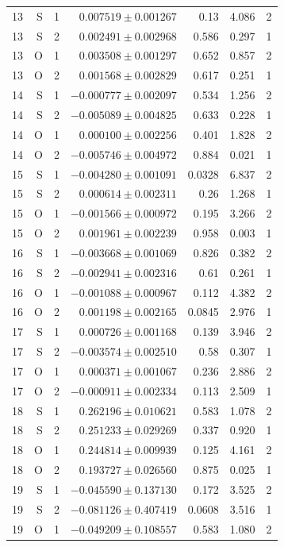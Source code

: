 {\begin{longtable}{lrrrrrr}
13 & S & 1 & $0.007519\pm0.001267$ & 0.13 & 4.086 & 2\\
13 & S & 2 & $0.002491\pm0.002968$ & 0.586 & 0.297 & 1\\
13 & O & 1 & $0.003508\pm0.001297$ & 0.652 & 0.857 & 2\\
13 & O & 2 & $0.001568\pm0.002829$ & 0.617 & 0.251 & 1\\
14 & S & 1 & $-0.000777\pm0.002097$ & 0.534 & 1.256 & 2\\
14 & S & 2 & $-0.005089\pm0.004825$ & 0.633 & 0.228 & 1\\
14 & O & 1 & $0.000100\pm0.002256$ & 0.401 & 1.828 & 2\\
14 & O & 2 & $-0.005746\pm0.004972$ & 0.884 & 0.021 & 1\\
15 & S & 1 & $-0.004280\pm0.001091$ & 0.0328 & 6.837 & 2\\
15 & S & 2 & $0.000614\pm0.002311$ & 0.26 & 1.268 & 1\\
15 & O & 1 & $-0.001566\pm0.000972$ & 0.195 & 3.266 & 2\\
15 & O & 2 & $0.001961\pm0.002239$ & 0.958 & 0.003 & 1\\
16 & S & 1 & $-0.003668\pm0.001069$ & 0.826 & 0.382 & 2\\
16 & S & 2 & $-0.002941\pm0.002316$ & 0.61 & 0.261 & 1\\
16 & O & 1 & $-0.001088\pm0.000967$ & 0.112 & 4.382 & 2\\
16 & O & 2 & $0.001198\pm0.002165$ & 0.0845 & 2.976 & 1\\
17 & S & 1 & $0.000726\pm0.001168$ & 0.139 & 3.946 & 2\\
17 & S & 2 & $-0.003574\pm0.002510$ & 0.58 & 0.307 & 1\\
17 & O & 1 & $0.000371\pm0.001067$ & 0.236 & 2.886 & 2\\
17 & O & 2 & $-0.000911\pm0.002334$ & 0.113 & 2.509 & 1\\
18 & S & 1 & $0.262196\pm0.010621$ & 0.583 & 1.078 & 2\\
18 & S & 2 & $0.251233\pm0.029269$ & 0.337 & 0.920 & 1\\
18 & O & 1 & $0.244814\pm0.009939$ & 0.125 & 4.161 & 2\\
18 & O & 2 & $0.193727\pm0.026560$ & 0.875 & 0.025 & 1\\
19 & S & 1 & $-0.045590\pm0.137130$ & 0.172 & 3.525 & 2\\
19 & S & 2 & $-0.081126\pm0.407419$ & 0.0608 & 3.516 & 1\\
19 & O & 1 & $-0.049209\pm0.108557$ & 0.583 & 1.080 & 2\\

\end{longtable}}
